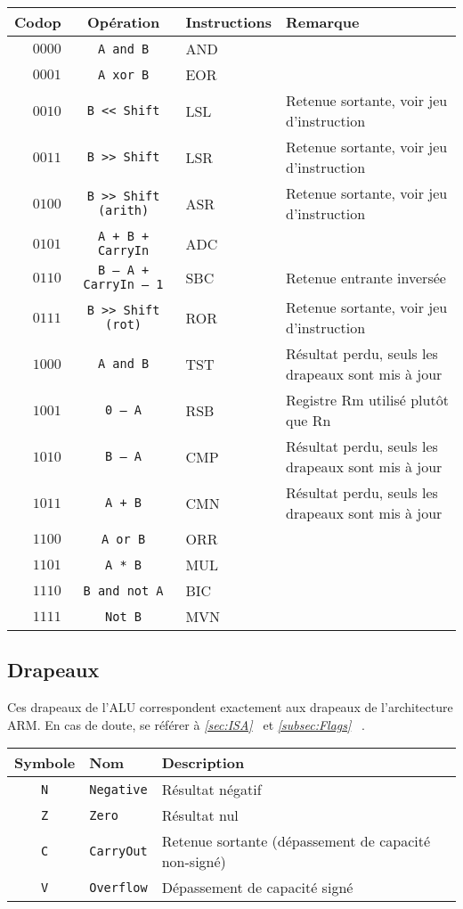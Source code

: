 \begin{tabular}{|r|c|l|l|}
\hline
\textbf{Codop}  & \textbf{Opération}	& \textbf{Instructions} & \textbf{Remarque}\\
\hline

$0000$ & \texttt{A and B}			& AND			&\\
\hline
$0001$ & \texttt{A xor B}			& EOR			&\\
\hline
$0010$ & \texttt{B << Shift}			& LSL			& Retenue sortante, voir jeu d'instruction\\
\hline
$0011$ & \texttt{B >> Shift}			& LSR			& Retenue sortante, voir jeu d'instruction\\
\hline
$0100$ & \texttt{B >> Shift (arith)}		& ASR			& Retenue sortante, voir jeu d'instruction\\
\hline
$0101$ & \texttt{A + B + CarryIn}		& ADC			&\\
\hline
$0110$ & \texttt{B – A + CarryIn – 1}		& SBC			& Retenue entrante inversée\\
\hline
$0111$ & \texttt{B >> Shift (rot)}		& ROR			& Retenue sortante, voir jeu d'instruction\\
\hline
$1000$ & \texttt{A and B}			& TST			& Résultat perdu, seuls les drapeaux sont mis à jour\\
\hline
$1001$ & \texttt{0 – A}				& RSB			& Registre Rm utilisé plutôt que Rn\\
\hline
$1010$ & \texttt{B – A}				& CMP			& Résultat perdu, seuls les drapeaux sont mis à jour\\
\hline
$1011$ & \texttt{A + B}				& CMN			& Résultat perdu, seuls les drapeaux sont mis à jour\\
\hline
$1100$ & \texttt{A or B}			& ORR			&\\
\hline
$1101$ & \texttt{A * B}				& MUL			&\\
\hline
$1110$ & \texttt{B and not A}			& BIC			&\\
\hline
$1111$ & \texttt{Not B}				& MVN			&\\
\hline
\end{tabular}

\subsection{Drapeaux}

Ces drapeaux de l'ALU correspondent exactement aux drapeaux de l'architecture ARM. En cas de doute, se référer à \textit{\ref{sec:ISA}~} et \textit{\ref{subsec:Flags}~} .

\begin{tabular}{|c|l|l|}
\hline
\textbf{Symbole} & \textbf{Nom} & \textbf{Description}\\
\hline

\texttt{N}	& \texttt{Negative}	& Résultat négatif\\
\hline
\texttt{Z}	& \texttt{Zero}		& Résultat nul\\
\hline
\texttt{C}	& \texttt{CarryOut}	& Retenue sortante (dépassement de capacité non-signé)\\
\hline
\texttt{V}	&  \texttt{Overflow}	& Dépassement de capacité signé\\

\hline
\end{tabular}
